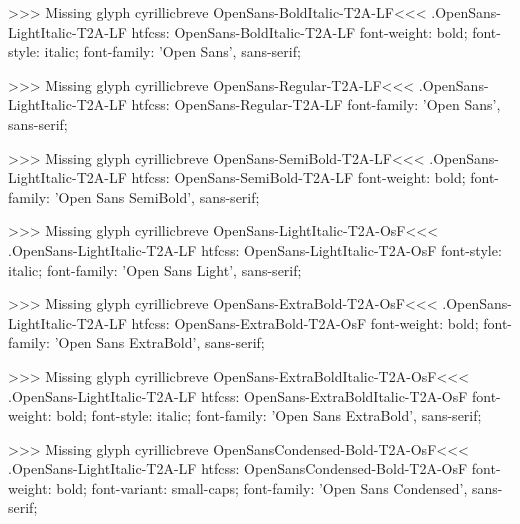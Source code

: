 >>>
Missing glyph	cyrillicbreve
\<OpenSans-BoldItalic-T2A-LF\><<<
.OpenSans-LightItalic-T2A-LF
htfcss:  OpenSans-BoldItalic-T2A-LF  font-weight: bold; font-style: italic; font-family: 'Open Sans', sans-serif;

>>>
Missing glyph	cyrillicbreve
\<OpenSans-Regular-T2A-LF\><<<
.OpenSans-LightItalic-T2A-LF
htfcss:  OpenSans-Regular-T2A-LF  font-family: 'Open Sans', sans-serif;

>>>
Missing glyph	cyrillicbreve
\<OpenSans-SemiBold-T2A-LF\><<<
.OpenSans-LightItalic-T2A-LF
htfcss:  OpenSans-SemiBold-T2A-LF  font-weight: bold; font-family: 'Open Sans SemiBold', sans-serif;

>>>
Missing glyph	cyrillicbreve
\<OpenSans-LightItalic-T2A-OsF\><<<
.OpenSans-LightItalic-T2A-LF
htfcss:  OpenSans-LightItalic-T2A-OsF  font-style: italic; font-family: 'Open Sans Light', sans-serif;

>>>
Missing glyph	cyrillicbreve
\<OpenSans-ExtraBold-T2A-OsF\><<<
.OpenSans-LightItalic-T2A-LF
htfcss:  OpenSans-ExtraBold-T2A-OsF  font-weight: bold; font-family: 'Open Sans ExtraBold', sans-serif;

>>>
Missing glyph	cyrillicbreve
\<OpenSans-ExtraBoldItalic-T2A-OsF\><<<
.OpenSans-LightItalic-T2A-LF
htfcss:  OpenSans-ExtraBoldItalic-T2A-OsF  font-weight: bold; font-style: italic; font-family: 'Open Sans ExtraBold', sans-serif;

>>>
Missing glyph	cyrillicbreve
\<OpenSansCondensed-Bold-T2A-OsF\><<<
.OpenSans-LightItalic-T2A-LF
htfcss:  OpenSansCondensed-Bold-T2A-OsF  font-weight: bold; font-variant: small-caps; font-family: 'Open Sans Condensed', sans-serif;

